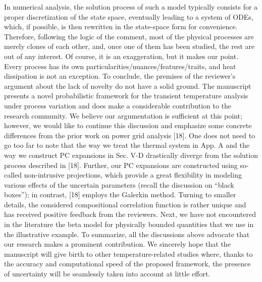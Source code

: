 \begin{authors}
In numerical analysis, the solution process of such a model typically consists for a proper discretization of the state space, eventually leading to a system of ODEs, which, if possible, is then rewritten in the state-space form for convenience.
Therefore, following the logic of the comment, most of the physical processes are merely clones of each other, and, once one of them has been studied, the rest are out of any interest.
Of course, it is an exaggeration, but it makes our point.
Every process has its own particularities/nuances/features/traits, and heat dissipation is not an exception.
To conclude, the premises of the reviewer’s argument about the lack of novelty do not have a solid ground.
The manuscript presents a novel probabilistic framework for the transient temperature analysis under process variation and does make a considerable contribution to the research community.
We believe our argumentation is sufficient at this point; however, we would like to continue this discussion and emphasize some concrete differences from the prior work on power grid analysis [18].
One does not need to go too far to note that the way we treat the thermal system in App. A and the way we construct PC expansions in Sec. V-D drastically diverge from the solution process described in [18].
Further, our PC expansions are constructed using so-called non-intrusive projections, which provide a great flexibility in modeling various effects of the uncertain parameters (recall the discussion on ``black boxes''); in contrast, [18] employs the Galerkin method.
Turning to smaller details, the considered compositional correlation function is rather unique and has received positive feedback from the reviewers.
Next, we have not encountered in the literature the beta model for physically bounded quantities that we use in the illustrative example.
To summarize, all the discussions above advocate that our research makes a prominent contribution.
We sincerely hope that the manuscript will give birth to other temperature-related studies where, thanks to the accuracy and computational speed of the proposed framework, the presence of uncertainty will be seamlessly taken into account at little effort.


\end{authors}
